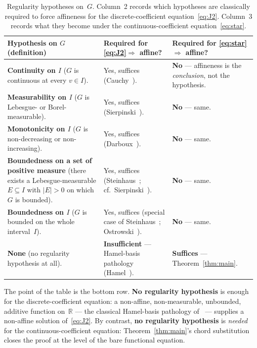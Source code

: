 \documentclass[11pt,a4paper]{amsart}
\newcommand{\R}{\mathbb R}
\begin{document}
\begin{table}[ht]
\renewcommand{\arraystretch}{1.4}
\begin{tabularx}{\textwidth}{@{} X | X | X @{}}
\toprule
\textbf{Hypothesis on $G$ (definition)} & \textbf{Required for
\eqref{eq:J2}$\Rightarrow$ affine?} & \textbf{Required for
\eqref{eq:star}$\Rightarrow$ affine?}\\
\midrule
\textbf{Continuity on $I$} ($G$ is continuous at every $v\in I$).
& Yes, suffices (Cauchy~\cite{Cauchy1821}).
& \textbf{No} --- affineness is the \emph{conclusion}, not the hypothesis.\\
\midrule
\textbf{Measurability on $I$} ($G$ is Lebesgue- or Borel-measurable).
& Yes, suffices (Sierpinski~\cite{Sierpinski1920}).
& \textbf{No} --- same.\\
\midrule
\textbf{Monotonicity on $I$} ($G$ is non-decreasing or non-increasing).
& Yes, suffices (Darboux~\cite{Darboux1875}).
& \textbf{No} --- same.\\
\midrule
\textbf{Boundedness on a set of positive measure} (there exists a
Lebesgue-measurable $E\subseteq I$ with $|E|>0$ on which $G$ is bounded).
& Yes, suffices (Steinhaus~\cite{Steinhaus1920};
cf.~Sierpinski~\cite{Sierpinski1920}).
& \textbf{No} --- same.\\
\midrule
\textbf{Boundedness on $I$} ($G$ is bounded on the whole interval~$I$).
& Yes, suffices (special case of Steinhaus~\cite{Steinhaus1920};
Ostrowski~\cite{Ostrowski1929}).
& \textbf{No} --- same.\\
\midrule
\textbf{None} (no regularity hypothesis at all).
& \textbf{Insufficient} --- Hamel-basis pathology (Hamel~\cite{Hamel1905}).
& \textbf{Suffices} --- Theorem~\ref{thm:main}.\\
\bottomrule
\end{tabularx}
\caption{Regularity hypotheses on~$G$. Column~2 records which hypotheses
are classically required to force affineness for the discrete-coefficient
equation~\eqref{eq:J2}. Column~3 records what they become under the
continuous-coefficient equation~\eqref{eq:star}.}
\label{tab:dictionary}
\end{table}

The point of the table is the bottom row. \textbf{No regularity hypothesis}
is enough for the discrete-coefficient equation: a non-affine,
non-measurable, unbounded, additive function on~$\R$ --- the classical
Hamel-basis pathology of~\cite{Hamel1905} --- supplies a non-affine
solution of~\eqref{eq:J2}. By contrast, \textbf{no regularity hypothesis}
is \emph{needed} for the continuous-coefficient equation:
Theorem~\ref{thm:main}'s chord substitution closes the proof at the level
of the bare functional equation.
\end{document}

